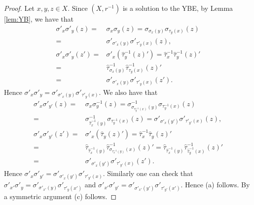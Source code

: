 \begin{proof}
Let $x,y,z\in X$. Since $(X,r^{-1})$ is a solution to the YBE, by Lemma \ref{lem:YB}, we have that
\begin{align*}
    \sigma'_{x}\sigma'_{y}(z)=&\sigma_{x}\sigma_{y}(z)=\sigma_{\sigma_x(y)}\sigma_{\tau_y(x)}(z)\\
    =&\sigma'_{\sigma'_x(y)}\sigma'_{\tau'_y(x)}(z),\\
        \sigma'_{x}\sigma'_{y}(z')=&\sigma'_{x}(\widehat{\tau}^{-1}_{y}(z)')=\widehat{\tau}^{-1}_{x}\widehat{\tau}^{-1}_{y}(z)'\\
        =&\widehat{\tau}^{-1}_{\sigma_x(y)}\widehat{\tau}^{-1}_{\tau_y(x)}(z)'\\
    =&\sigma'_{\sigma'_x(y)}\sigma'_{\tau'_y(x)}(z').
    \end{align*}
Hence $\sigma'_x\sigma'_y=\sigma'_{\sigma'_x(y)}\sigma'_{\tau'_y(x)}$. We also have that   
\begin{align*}
    \sigma'_{x}\sigma'_{y'}(z)=&\sigma_{x}\sigma^{-1}_{y}(z)=\sigma^{-1}_{\sigma_{\tau^{-1}_y(x)}(y)}\sigma_{\tau^{-1}_y(x)}(z)\\
    =&\sigma^{-1}_{\widehat{\tau}^{-1}_x(y)}\sigma_{\tau^{-1}_y(x)}(z)=\sigma'_{\sigma'_x(y')}\sigma'_{\tau'_{y'}(x)}(z),\\
        \sigma'_{x}\sigma'_{y'}(z')=&\sigma'_{x}(\widehat{\tau}_{y}(z)')=\widehat{\tau}^{-1}_{x}\widehat{\tau}_{y}(z)'\\
        =&\widehat{\tau}_{\widehat{\tau}^{-1}_x(y)}\widehat{\tau}^{-1}_{\sigma_{\tau^{-1}_x(y)}(x)}(z)'=\widehat{\tau}_{\widehat{\tau}^{-1}_x(y)}\widehat{\tau}^{-1}_{\widehat{\tau}^{-1}_y(x)}(z)'\\
    =&\sigma'_{\sigma'_x(y')}\sigma'_{\tau'_{y'}(x)}(z').
    \end{align*}
Hence $\sigma'_x\sigma'_{y'}=\sigma'_{\sigma'_x(y')}\sigma'_{\tau'_{y'}(x)}$. Similarly one can check that
$\sigma'_{x'}\sigma'_{y}=\sigma'_{\sigma'_{x'}(y)}\sigma'_{\tau'_{y}(x')}$ and $\sigma'_{x'}\sigma'_{y'}=\sigma'_{\sigma'_{x'}(y')}\sigma'_{\tau'_{y'}(x')}$. Hence (a) follows.
By a symmetric argument (c) follows.


\end{proof}
